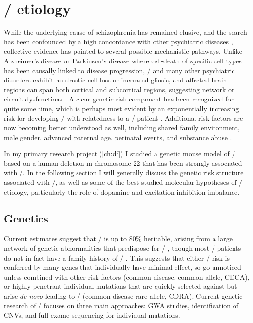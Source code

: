\section{\Scz/ etiology}
\label{sec:intro:scz:etiology}
While the underlying cause of schizophrenia has remained elusive, and the search has been confounded by a high concordance with other psychiatric diseases \citep{Kessler2005}, collective evidence has pointed to several possible mechanistic pathways.
Unlike Alzheimer's disease or Parkinson's disease where cell-death of specific cell types has been causally linked to disease progression, \scz/ and many other psychiatric disorders exhibit no drastic cell loss or increased gliosis, and affected brain regions can span both cortical and subcortical regions, suggesting network or circuit dysfunctions \citep{Uhlhaas2012, Lewis2002}.
A clear genetic-risk component has been recognized for quite some time, which is perhaps most evident by an exponentially increasing risk for developing \scz/ with relatedness to a \scz/ patient \citep{Rodriguez-Murillo2012}.
Additional risk factors are now becoming better understood as well, including shared family environment, male gender, advanced paternal age, perinatal events, and substance abuse \citep{Lichtenstein2009}.

In my primary research project (\autoref{ch:df}) I studied a genetic mouse model of \scz/ based on a human deletion in chromosome 22 that has been strongly associated with \scz/. In the following section I will generally discuss the genetic risk structure associated with \scz/, as well as some of the best-studied molecular hypotheses of \scz/ etiology, particularly the role of dopamine and excitation-inhibition imbalance.

\subsection{Genetics}
Current estimates suggest that \scz/ is up to 80\% heritable, arising from a large network of genetic abnormalities that predispose for \scz/ \citep{Ripke2011, Tandon2008}, though most \scz/ patients do not in fact have a family history of \scz/ \citep{Tandon2008, Rodriguez-Murillo2012}.
This suggests that either \scz/ risk is conferred by many genes that individually have minimal effect, so go unnoticed unless combined with other risk factors (common disease, common allele, CDCA), or highly-penetrant individual mutations that are quickly selected against but arise \textit{de novo} leading to \scz/ (common disease-rare allele, CDRA).
Current genetic research of \scz/ focuses on three main approaches: \ac{GWA} studies, identification of \acp{CNV}, and full exome sequencing for individual mutations.

